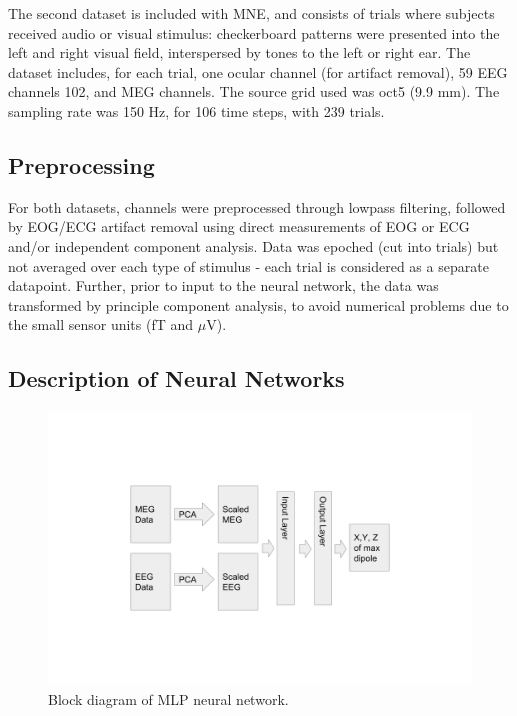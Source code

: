 \documentclass[journal]{IEEEtran}
\begin{document}
The second dataset \cite{gramfort2013meg} is included with MNE, and consists of trials where subjects received audio or visual stimulus: checkerboard patterns were presented into the left and right visual field, interspersed by tones to the left or right ear. The dataset includes, for each trial, one ocular channel (for artifact removal), 59 EEG channels 102, and MEG channels. The source grid used was oct5 (9.9 mm). The sampling rate was 150 Hz, for 106 time steps, with 239 trials. 

\subsection{Preprocessing}
For both datasets, channels were preprocessed through lowpass filtering, followed by EOG/ECG artifact removal using direct measurements of EOG or ECG and/or independent component analysis. Data was epoched (cut into trials) but not averaged over each type of stimulus - each trial is considered as a separate datapoint. Further, prior to input to the neural network, the data was transformed by principle component analysis, to avoid numerical problems due to the small sensor units (fT and $\mu$V).

\subsection{Description of Neural Networks} 
\begin{figure}[h!]
\centering
\includegraphics[width=5in]{mlp}
\caption{Block diagram of MLP neural network.}
\label{fig:mlp}
\end{figure}

\end{document}
